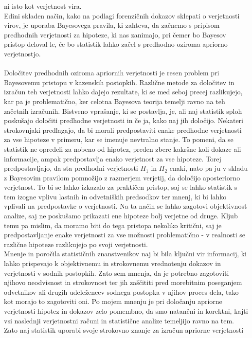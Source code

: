 \documentclass[fin1, tisk]{fmfdelo}
\theoremstyle{definition}
\theoremstyle{trditev}
\theoremstyle{izrek}
\begin{document}
ni isto kot verjetnost vira. \\
Edini skladen način, kako na podlagi forenzičnih dokazov sklepati o verjetnosti virov, je uporaba Bayesovega pravila, ki zahteva, da začnemo s
pripisom predhodnih verjetnosti za hipoteze, ki nas zanimajo, pri čemer bo Bayesov pristop deloval le, če bo statistik lahko 
začel s predhodno oziroma apriorno verjetnostjo.\\\\
Določitev predhodnih oziroma apriornih verjetnosti je resen problem pri Bayesovemu pristopu v kazenskih postopkih. Različne metode za določitev 
in izračun teh verjetnosti lahko dajejo rezultate, ki se med seboj precej razlikujejo, kar pa je problematično, ker celotna Bayesova teorija 
temelji ravno na teh začetnih izračunih. Bistveno vprašanje, ki se postavlja, je, ali naj statistik sploh poskušajo določiti 
predhodne verjetnosti in če ja, kako naj jih določijo. Nekateri strokovnjaki predlagajo, da bi morali predpostaviti enake predhodne verjetnosti 
za vse hipoteze v primeru, kar se imenuje nevtralno stanje. To pomeni, da se statistik ne opredeli za nobeno od hipotez, preden 
zbere kakršne koli dokaze ali informacije, ampak predpostavlja enako verjetnost za vse hipoteze. Torej predpostavljajo, da sta predhodni verjetnosti 
$H_1$ in $H_2$ enaki, nato pa ju v skladu z Bayesovim pravilom pomnožijo z razmerjem verjetij, da določijo aposteriorno verjetnost. To bi se lahko 
izkazalo za praktičen pristop, saj se lahko statistik s tem izogne vplivu lastnih in odvetniških predsodkov ter mnenj, ki bi lahko 
vplivali na predpostavke o verjetnosti. Na ta način se lahko zagotovi objektivnost analize, saj ne poskušamo prikazati ene hipoteze bolj verjetne 
od druge. Kljub temu pa mislim, da moramo biti do tega pristopa nekoliko kritični, saj je predpostavljanje enake verjetnosti za vse možnosti 
problematično - v realnosti se različne hipoteze razlikujejo po svoji verjetnosti.\\
Mnenje in poročila statističnih znanstvenikov naj bi bila ključni vir informacij, ki lahko prispevajo k objektivnemu in strokovnemu 
vrednotenju dokazov in verjetnosti v sodnih postopkih. Zato sem mnenja, da je potrebno zagotoviti njihovo neodvisnost in strokovnost ter jih 
zaščititi pred morebitnim poseganjem odvetnikov ali drugih udeležencev sodnega postopka v njihov proces dela, tako kot morajo to zagotoviti oni. 
Po mojem mnenju je pri določanju apriorne verjetnosti hipotez in dokazov zelo pomembno, da smo natančni in korektni, kajti vsi naslednji verjetnostni 
računi in statistične analize temeljijo ravno na tem. Zato naj statistik uporabi svoje strokovno znanje za izračun apriorne verjetnosti 
\end{document}
